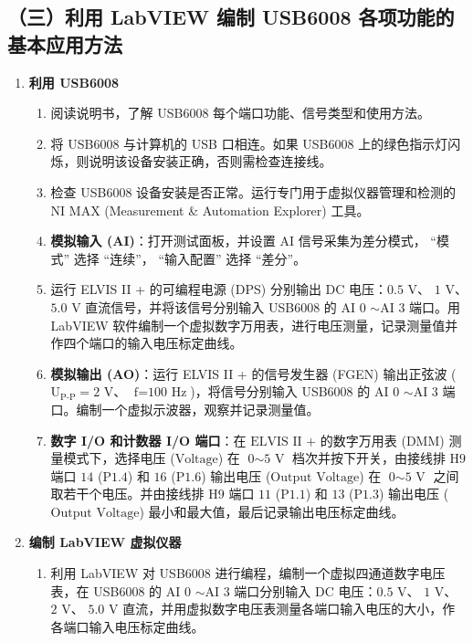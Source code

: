 \documentclass[a4paper,8pt,twocolumn]{article}
\begin{document}
\subsection*{（三）利用 LabVIEW 编制 USB6008 各项功能的基本应用方法}
\begin{enumerate}
    \item \textbf{利用 USB6008}
    \begin{enumerate}
        \item 阅读说明书，了解 USB6008 每个端口功能、信号类型和使用方法。
        \item 将 USB6008 与计算机的 USB 口相连。如果 USB6008 上的绿色指示灯闪烁，则说明该设备安装正确，否则需检查连接线。
        \item 检查 USB6008 设备安装是否正常。运行专门用于虚拟仪器管理和检测的 NI MAX (Measurement \& Automation Explorer) 工具。
        \item \textbf{模拟输入 (AI)}：打开测试面板，并设置 AI 信号采集为差分模式， “模式” 选择 “连续”， “输入配置” 选择 “差分”。
        \item 运行 ELVIS II + 的可编程电源 (DPS) 分别输出 DC 电压：$\text{0.5 V}$、 $\text{1 V}$、 $\text{5.0 V}$ 直流信号，并将该信号分别输入 USB6008 的 $\text{AI 0}$ $\sim \text{AI 3}$ 端口。用 LabVIEW 软件编制一个虚拟数字万用表，进行电压测量，记录测量值并作四个端口的输入电压标定曲线。
        \item \textbf{模拟输出 (AO)}：运行 ELVIS II + 的信号发生器 (FGEN) 输出正弦波 ($\text{U}_{\text{P-P}} = \text{2 V}$、 $\text{f} = \text{100 Hz}$)，将信号分别输入 USB6008 的 $\text{AI 0}$ $\sim \text{AI 3}$ 端口。编制一个虚拟示波器，观察并记录测量值。
        \item \textbf{数字 I/O 和计数器 I/O 端口}：在 $\text{ELVIS II +}$ 的数字万用表 ($\text{DMM}$) 测量模式下，选择电压 ($\text{Voltage}$) 在 $\text{0} \sim \text{5 V}$ 档次并按下开关，由接线排 $\text{H9}$ 端口 $\text{14}$ ($\text{P1.4}$) 和 $\text{16}$ ($\text{P1.6}$) 输出电压 ($\text{Output Voltage}$) 在 $\text{0} \sim \text{5 V}$ 之间取若干个电压。并由接线排 $\text{H9}$ 端口 $\text{11}$ ($\text{P1.1}$) 和 $\text{13}$ ($\text{P1.3}$) 输出电压 ($\text{Output Voltage}$) 最小和最大值，最后记录输出电压标定曲线。
    \end{enumerate}
    \item \textbf{编制 LabVIEW 虚拟仪器}
    \begin{enumerate}
        \item 利用 LabVIEW 对 USB6008 进行编程，编制一个虚拟四通道数字电压表，在 USB6008 的 $\text{AI 0}$ $\sim \text{AI 3}$ 端口分别输入 DC 电压：$\text{0.5 V}$、 $\text{1 V}$、 $\text{2 V}$、 $\text{5.0 V}$ 直流，并用虚拟数字电压表测量各端口输入电压的大小，作各端口输入电压标定曲线。

\end{enumerate}
\end{enumerate}
\end{document}
